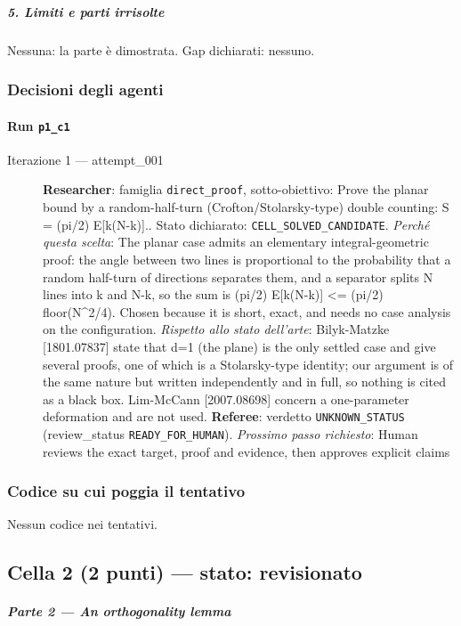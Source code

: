 \documentclass[11pt,a4paper]{article}
\begin{document}
\subparagraph{5. Limiti e parti
irrisolte}\label{limiti-e-parti-irrisolte}

Nessuna: la parte è dimostrata. Gap dichiarati: nessuno.

\subsubsection{Decisioni degli agenti}
\paragraph{Run \texttt{p1\_c1}}
\begin{description}
\item[Iterazione 1 — attempt\_001]
\textbf{Researcher}: famiglia \texttt{direct\_proof}, sotto-obiettivo: Prove the planar bound by a random-half-turn (Crofton/Stolarsky-type) double counting: S = (pi/2) E[k(N-k)].. Stato dichiarato: \texttt{CELL\_SOLVED\_CANDIDATE}.
\emph{Perché questa scelta}: The planar case admits an elementary integral-geometric proof: the angle between two lines is proportional to the probability that a random half-turn of directions separates them, and a separator splits N lines into k and N-k, so the sum is (pi/2) E[k(N-k)] \textless{}= (pi/2) floor(N\textasciicircum{}2/4). Chosen because it is short, exact, and needs no case analysis on the configuration.
\emph{Rispetto allo stato dell'arte}: Bilyk-Matzke [1801.07837] state that d=1 (the plane) is the only settled case and give several proofs, one of which is a Stolarsky-type identity; our argument is of the same nature but written independently and in full, so nothing is cited as a black box. Lim-McCann [2007.08698] concern a one-parameter deformation and are not used.
\textbf{Referee}: verdetto \texttt{UNKNOWN\_STATUS} (review\_status \texttt{READY\_FOR\_HUMAN}).
\emph{Prossimo passo richiesto}: Human reviews the exact target, proof and evidence, then approves explicit claims
\end{description}

\subsubsection{Codice su cui poggia il tentativo}
Nessun codice nei tentativi.

\subsection{Cella 2 (2 punti) — stato: revisionato}
\subparagraph{Parte 2 --- An orthogonality
lemma}\label{parte-2-an-orthogonality-lemma}
\end{document}
